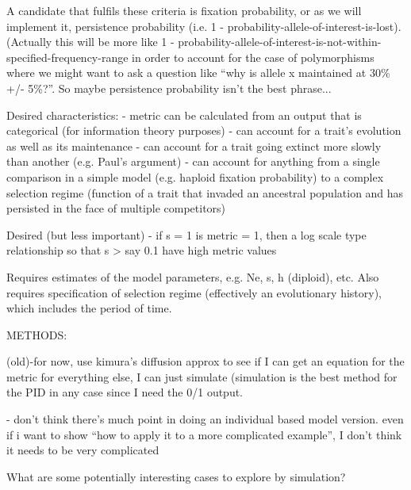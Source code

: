 \documentclass{article}
\begin{document}
A candidate that fulfils these criteria is fixation probability, or as we will implement it, persistence probability (i.e. 1 - probability-allele-of-interest-is-lost). (Actually this will be more like 1 - probability-allele-of-interest-is-not-within-specified-frequency-range in order to account for the case of polymorphisms where we might want to ask a question like ``why is allele x maintained at 30\% +/- 5\%?''. So maybe persistence probability isn't the best phrase...

Desired characteristics:
- metric can be calculated from an output that is categorical (for information theory purposes)
- can account for a trait's evolution as well as its maintenance
- can account for a trait going extinct more slowly than another (e.g. Paul's argument)
- can account for anything from a single comparison in a simple model (e.g. haploid fixation probability) to a complex selection regime (function of a trait that invaded an ancestral population and has persisted in the face of multiple competitors)

Desired (but less important)
- if s = 1 is metric = 1, then a log scale type relationship so that s > say 0.1 have high metric values

Requires estimates of the model parameters, e.g. Ne, s, h (diploid), etc.
Also requires specification of selection regime (effectively an evolutionary history), which includes the period of time.

METHODS: 

(old)-for now, use kimura's diffusion approx to see if I can get an equation for the metric
for everything else, I can just simulate (simulation is the best method for the PID in any case since I need the 0/1 output.

- don't think there's much point in doing an individual based model version. even if i want to show ``how to apply it to a more complicated example'', I don't think it needs to be very complicated

What are some potentially interesting cases to explore by simulation?
\end{document}
